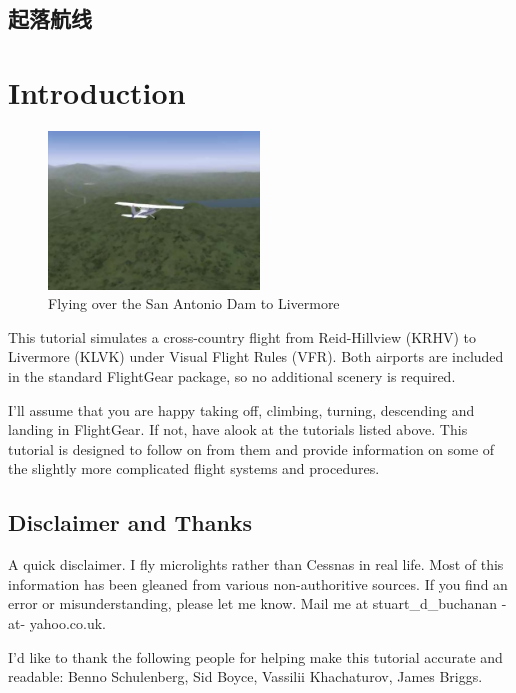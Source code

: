 \subsection{起落航线}

\iffalse
\section{Introduction}

\begin{figure}[!htp]
\centering
\includegraphics[width=0.5\textwidth]{antonio2}
\caption{Flying over the San Antonio Dam to Livermore}
\end{figure}

This tutorial simulates a cross-country flight from Reid-Hillview (KRHV) to
Livermore (KLVK) under Visual Flight Rules (VFR). Both airports are
included in the standard FlightGear package, so no additional scenery is required.

I'll assume that you are happy taking off, climbing, turning, descending
and landing in FlightGear. If not, have alook at the tutorials listed above.
This tutorial is designed to follow on from them and provide information on
some of the slightly more complicated flight systems and procedures.

\subsection{Disclaimer and Thanks}

A quick disclaimer. I fly microlights rather than Cessnas in real life. Most of
this information has been gleaned from various non-authoritive sources. If you
find an error or misunderstanding, please let me know. Mail me at
stuart\_d\_buchanan -at- yahoo.co.uk.

I'd like to thank the following people for helping make this tutorial accurate
and readable: Benno Schulenberg, Sid Boyce, Vassilii Khachaturov, James Briggs.

